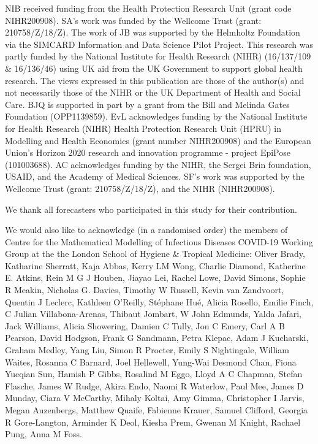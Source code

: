 \documentclass[
]{article}
\begin{document}
NIB received funding from the Health Protection Research Unit (grant code NIHR200908). SA's work was funded by the Wellcome Trust (grant: 210758/Z/18/Z). The work of JB was supported by the Helmholtz Foundation via the SIMCARD Information and Data Science Pilot Project. This research was partly funded by the National Institute for Health Research (NIHR) (16/137/109 \& 16/136/46) using UK aid from the UK Government to support global health research. The views expressed in this publication are those of the author(s) and not necessarily those of the NIHR or the UK Department of Health and Social Care. BJQ is supported in part by a grant from the Bill and Melinda Gates Foundation (OPP1139859). EvL acknowledges funding by the National Institute for Health Research (NIHR) Health Protection Research Unit (HPRU) in Modelling and Health Economics (grant number NIHR200908) and the European Union's Horizon 2020 research and innovation programme - project EpiPose (101003688). AC acknowledges funding by the NIHR, the Sergei Brin foundation, USAID, and the Academy of Medical Sciences. SF's work was supported by the Wellcome Trust (grant: 210758/Z/18/Z), and the NIHR (NIHR200908).

We thank all forecasters who participated in this study for their contribution.

We would also like to acknowledge (in a randomised order) the members of Centre for the Mathematical Modelling of Infectious Diseases COVID-19 Working Group at the the London School of Hygiene \& Tropical Medicine: Oliver Brady, Katharine Sherratt, Kaja Abbas, Kerry LM Wong, Charlie Diamond, Katherine E. Atkins, Rein M G J Houben, Jiayao Lei, Rachel Lowe, David Simons, Sophie R Meakin, Nicholas G. Davies, Timothy W Russell, Kevin van Zandvoort, Quentin J Leclerc, Kathleen O'Reilly, Stéphane Hué, Alicia Rosello, Emilie Finch, C Julian Villabona-Arenas, Thibaut Jombart, W John Edmunds, Yalda Jafari, Jack Williams, Alicia Showering, Damien C Tully, Jon C Emery, Carl A B Pearson, David Hodgson, Frank G Sandmann, Petra Klepac, Adam J Kucharski, Graham Medley, Yang Liu, Simon R Procter, Emily S Nightingale, William Waites, Rosanna C Barnard, Joel Hellewell, Yung-Wai Desmond Chan, Fiona Yueqian Sun, Hamish P Gibbs, Rosalind M Eggo, Lloyd A C Chapman, Stefan Flasche, James W Rudge, Akira Endo, Naomi R Waterlow, Paul Mee, James D Munday, Ciara V McCarthy, Mihaly Koltai, Amy Gimma, Christopher I Jarvis, Megan Auzenbergs, Matthew Quaife, Fabienne Krauer, Samuel Clifford, Georgia R Gore-Langton, Arminder K Deol, Kiesha Prem, Gwenan M Knight, Rachael Pung, Anna M Foss.
\end{document}
